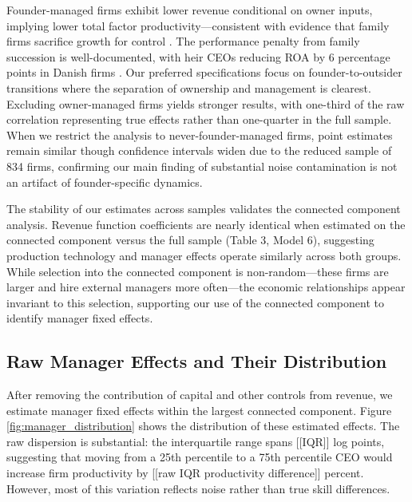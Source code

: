 \documentclass[11pt,a4paper]{article}
\begin{document}
Founder-managed firms exhibit lower revenue conditional on owner inputs, implying lower total factor productivity—consistent with evidence that family firms sacrifice growth for control \citep{bennedsen2007inside}. The performance penalty from family succession is well-documented, with heir CEOs reducing ROA by 6 percentage points in Danish firms \citep{bennedsen2007family}. Our preferred specifications focus on founder-to-outsider transitions where the separation of ownership and management is clearest. Excluding owner-managed firms yields stronger results, with one-third of the raw correlation representing true effects rather than one-quarter in the full sample. When we restrict the analysis to never-founder-managed firms, point estimates remain similar though confidence intervals widen due to the reduced sample of 834 firms, confirming our main finding of substantial noise contamination is not an artifact of founder-specific dynamics.




The stability of our estimates across samples validates the connected component analysis. Revenue function coefficients are nearly identical when estimated on the connected component versus the full sample (Table 3, Model 6), suggesting production technology and manager effects operate similarly across both groups. While selection into the connected component is non-random—these firms are larger and hire external managers more often—the economic relationships appear invariant to this selection, supporting our use of the connected component to identify manager fixed effects.

\subsection{Raw Manager Effects and Their Distribution}

After removing the contribution of capital and other controls from revenue, we estimate manager fixed effects within the largest connected component. Figure \ref{fig:manager_distribution} shows the distribution of these estimated effects. The raw dispersion is substantial: the interquartile range spans [[IQR]] log points, suggesting that moving from a 25th percentile to a 75th percentile CEO would increase firm productivity by [[raw IQR productivity difference]] percent. However, most of this variation reflects noise rather than true skill differences.
\end{document}
